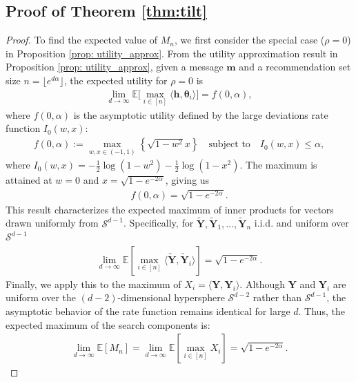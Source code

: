 \documentclass[12pt]{article}
\theoremstyle{definition}
\theoremstyle{remark}
\begin{document}
\subsection{Proof of Theorem \ref{thm:tilt}}
\label{app:proof_thm_tilt}
\begin{proof}
To find the expected value of $M_n$, we first consider the special case ($\rho=0$) in Proposition \ref{prop: utility_approx}. From the utility approximation result in Proposition \ref{prop: utility_approx}, given a message $\mathbf{m}$ and a recommendation set size $n = \lfloor e^{d \alpha} \rfloor$, the expected utility for $\rho=0$ is
\begin{align*}
\lim_{d\rightarrow \infty}\mathbb{E} \Big[ \max_{i \in [n]} \langle \mathbf{h}, \boldsymbol{\theta}_i \rangle \Big] = f(0, \alpha),
\end{align*}
where $f(0, \alpha)$ is the asymptotic utility defined by the large deviations rate function $I_0(w, x)$:
\begin{align*}
f(0, \alpha) := \max_{w, x \in (-1, 1)} \left\{ \sqrt{1-w^2} x \right\} \quad \text{subject to} \quad I_0(w, x) \leq \alpha,
\end{align*}
where $I_0(w, x) = -\frac{1}{2} \log(1-w^2) - \frac{1}{2} \log(1-x^2)$. The maximum is attained at $w=0$ and $x = \sqrt{1 - e^{-2\alpha}}$, giving us
\begin{align*}
f(0, \alpha) = \sqrt{1 - e^{-2\alpha}}.
\end{align*}
This result characterizes the expected maximum of inner products for vectors drawn uniformly from $\mathcal{S}^{d-1}$. Specifically, for $\tilde{\mathbf{Y}}, \tilde{\mathbf{Y}}_1, \dots, \tilde{\mathbf{Y}}_n$ i.i.d. and uniform over $\mathcal{S}^{d-1}$
\begin{align*}
\lim_{d\rightarrow \infty} \mathbb{E} \left[ \max_{i \in [n]} \langle \tilde{\mathbf{Y}}, \tilde{\mathbf{Y}}_i \rangle \right] = \sqrt{1 - e^{-2\alpha}}.
\end{align*}
Finally, we apply this to the maximum of $X_i = \langle \mathbf{Y}, \mathbf{Y}_i \rangle$. Although $\mathbf{Y}$ and $\mathbf{Y}_i$ are uniform over the $(d-2)$-dimensional hypersphere $\mathcal{S}^{d-2}$ rather than $\mathcal{S}^{d-1}$, the asymptotic behavior of the rate function remains identical for large $d$. Thus, the expected maximum of the search components is:
\begin{align*}
\lim_{d\rightarrow \infty} \mathbb{E}[M_n] = \lim_{d\rightarrow \infty} \mathbb{E} \left[ \max_{i \in [n]} X_i \right] = \sqrt{1 - e^{-2\alpha}}.
\end{align*}

\end{proof}
\end{document}
